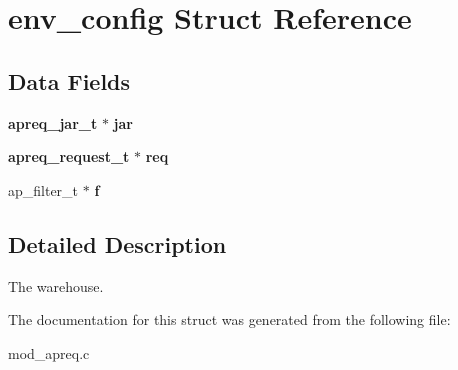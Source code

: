 \section{env\_\-config Struct Reference}
\label{structenv__config}
\subsection*{Data Fields}
\begin{CompactItemize}
\item 
{\bf apreq\_\-jar\_\-t} $\ast$ {\bf jar}\label{structenv__config_m0}

\item 
{\bf apreq\_\-request\_\-t} $\ast$ {\bf req}\label{structenv__config_m1}

\item 
ap\_\-filter\_\-t $\ast$ {\bf f}\label{structenv__config_m2}

\end{CompactItemize}


\subsection{Detailed Description}
The warehouse. 



The documentation for this struct was generated from the following file:\begin{CompactItemize}
\item 
mod\_\-apreq.c\end{CompactItemize}
